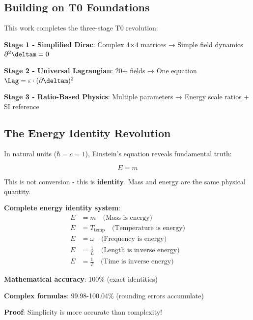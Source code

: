	\subsection{Building on T0 Foundations}
	
	This work completes the three-stage T0 revolution:
	
	\textbf{Stage 1 - Simplified Dirac}: Complex 4×4 matrices → Simple field dynamics $\partial^2 \deltam = 0$
	
	\textbf{Stage 2 - Universal Lagrangian}: 20+ fields → One equation $\Lag = \varepsilon \cdot (\partial \deltam)^2$
	
	\textbf{Stage 3 - Ratio-Based Physics}: Multiple parameters → Energy scale ratios + SI reference
	
	\subsection{The Energy Identity Revolution}
	
	In natural units ($\hbar = c = 1$), Einstein's equation reveals fundamental truth:
	
	\begin{equation}
		\boxed{E = m}
		\label{eq:energy_mass_identity}
	\end{equation}
	
	This is not conversion - this is \textbf{identity}. Mass and energy are the same physical quantity.
	
	\begin{tcolorbox}[colback=blue!5!white,colframe=blue!75!black,title=Universal Energy Relationships]
		\textbf{Complete energy identity system}:
		\begin{align}
			E &= m \quad \text{(Mass is energy)} \\
			E &= T_{\text{temp}} \quad \text{(Temperature is energy)} \\
			E &= \omega \quad \text{(Frequency is energy)} \\
			E &= \frac{1}{L} \quad \text{(Length is inverse energy)} \\
			E &= \frac{1}{T} \quad \text{(Time is inverse energy)}
		\end{align}
		
		\textbf{Mathematical accuracy}: 100\% (exact identities)
		
		\textbf{Complex formulas}: 99.98-100.04\% (rounding errors accumulate)
		
		\textbf{Proof}: Simplicity is more accurate than complexity!
	\end{tcolorbox}
	
